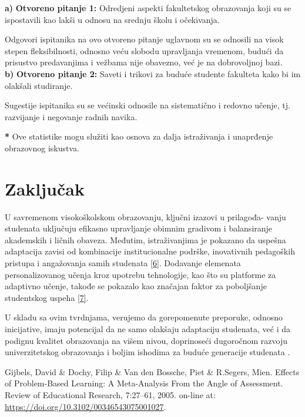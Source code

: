 \documentclass[a4paper]{article}
\begin{document}
\textbf{a) }\textbf{Otvoreno pitanje 1: }Odredjeni aspekti fakultetskog obrazovanja koji su se ispostavili kao lakši u odnosu na srednju školu i očekivanja.

Odgovori ispitanika na ovo otvoreno pitanje uglavnom su se odnosili na visok stepen fleksibilnosti, odnosno veću slobodu upravljanja vremenom, budući da prisustvo predavanjima i vežbama nije obavezno, već je na dobrovoljnoj bazi.\\

\textbf{b) }\textbf{Otvoreno pitanje 2: }Saveti i trikovi za buduće studente fakulteta kako bi im olakšali studiranje.

Sugestije ispitanika su se većinski odnosile na sistematično i redovno učenje, tj. razvijanje i negovanje radnih navika.

\textbf{*} Ove statistike mogu služiti kao osnova za dalja istraživanja i unaprđenje obrazovnog iskustva.\\




\section{Zaključak}
\label{sec:zakljucak}

U savremenom visokoškolskom obrazovanju, ključni izazovi u prilagođa-
vanju studenata uključuju efikasno upravljanje obimnim gradivom i balansiranje akademskih i ličnih obaveza. Međutim, istraživanjima je pokazano da uspešna adaptacija zavisi od kombinacije institucionalne podrške, inovativnih pedagoških pristupa i angažovanja samih studenata  \href{https://firstliteracy.org/wp-content/uploads/2015/07/How-Learning-Works.pdf}{[6]}. Dodavanje elemenata personalizovanog učenja kroz upotrebu tehnologije, kao što su platforme za adaptivno učenje, takođe se pokazalo kao značajan faktor za poboljšanje studentskog uspeha \href{https://www.frontiersin.org/journals/psychology/articles/10.3389/fpsyg.2022.770637/full}{[7]}. \

U skladu sa ovim tvrdnjama, verujemo da gorepomenute preporuke, odnosno inicijative, imaju potencijal da ne samo olakšaju adaptaciju studenata, već i da podignu kvalitet obrazovanja na višem nivou, doprinoseći dugoročnom razvoju univerzitetskog obrazovanja i boljim ishodima za buduće generacije studenata
. 
\newpage
{}\label{sec:literatura}
\appendix
 


\appendix
[1] Gijbels, David \& Dochy, Filip \& Van den Bossche, Piet \& R.Segers, Mien. Effects of Problem-Based Learning: A Meta-Analysis From the Angle of Assessment. Review of Educational Research, 7:27–61, 2005. on-line at: \href{https://doi.org/10.3102/00346543075001027}{https://doi.org/10.3102/00346543075001027}.\\
\end{document}

